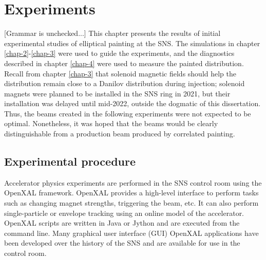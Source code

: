 \chapter{Experiments} \label{chap-5}

[Grammar is unchecked...]
This chapter presents the results of initial experimental studies of elliptical painting at the SNS. The simulations in chapter \ref{chap-2}-\ref{chap-3} were used to guide the experiments, and the diagnostics described in chapter \ref{chap-4} were used to measure the painted distribution. Recall from chapter \ref{chap-3} that solenoid magnetic fields should help the distribution remain close to a Danilov distribution during injection; solenoid magnets were planned to be installed in the SNS ring in 2021, but their installation was delayed until mid-2022, outside the dogmatic of this dissertation. Thus, the beams created in the following experiments were not expected to be optimal. Nonetheless, it was hoped that the beams would be clearly distinguishable from a production beam produced by correlated painting. 


\section{Experimental procedure}

Accelerator physics experiments are performed in the SNS control room using the OpenXAL framework. OpenXAL provides a high-level interface to perform tasks such as changing magnet strengths, triggering the beam, etc. It can also perform single-particle or envelope tracking using an online model of the accelerator. OpenXAL scripts are written in Java or Jython and are executed from the command line. Many graphical user interface (GUI) OpenXAL applications have been developed over the history of the SNS and are available for use in the control room. 

